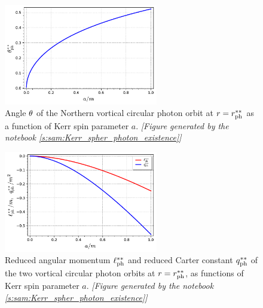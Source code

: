 \begin{figure}
\centerline{\includegraphics[width=0.6\textwidth]{gik_theta_ss.pdf}}
\caption[]{\label{f:gik:theta_ss} \footnotesize
Angle $\theta$ of the Northern vortical circular photon orbit at $r = r_{\rm ph}^{**}$ as a
function of Kerr spin parameter $a$.
\textsl{[Figure generated by the notebook \ref{s:sam:Kerr_spher_photon_existence}]}
}
\end{figure}

\begin{figure}
\centerline{\includegraphics[width=0.6\textwidth]{gik_ell_q_rss.pdf}}
\caption[]{\label{f:gik:ell_q_rss} \footnotesize
Reduced angular momentum $\ell_{\rm ph}^{**}$ and reduced Carter constant
$q_{\rm ph}^{**}$ of the two vortical circular photon orbits
at $r = r_{\rm ph}^{**}$, as
functions of Kerr spin parameter $a$.
\textsl{[Figure generated by the notebook \ref{s:sam:Kerr_spher_photon_existence}]}
}
\end{figure}

